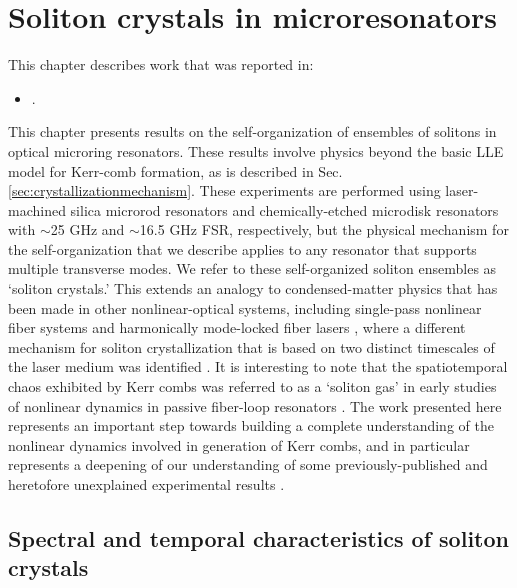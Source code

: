  \chapter{Soliton crystals in microresonators} \label{chap:SolitonCrystals}
 
  \begin{footnotesize}
 	\begin{spacing}{1.2}
 		This chapter describes work that was reported in:
 		\begin{itemize}
 			\item {}.\\
 		\end{itemize}
 	\end{spacing}
 \end{footnotesize}

This chapter presents results on the self-organization of ensembles of solitons in optical microring resonators. These results involve physics beyond the basic LLE model for Kerr-comb formation, as is described in Sec. \ref{sec:crystallizationmechanism}. These experiments are performed using laser-machined silica microrod resonators \cite{DelHaye2013} and chemically-etched microdisk \cite{Lee2012} resonators with $\sim$25 GHz and $\sim$16.5 GHz FSR, respectively, but the physical mechanism for the self-organization that we describe applies to any resonator that supports multiple transverse modes. We refer to these self-organized soliton ensembles as `soliton crystals.' This extends an analogy to condensed-matter physics that has been made in other nonlinear-optical systems, including single-pass nonlinear fiber systems \cite{Zajnulina2017} and harmonically mode-locked fiber lasers \cite{Haboucha2008,Amrani2011a}, where a different mechanism for soliton crystallization that is based on two distinct timescales of the laser medium was identified \cite{Haboucha2008c}. It is interesting to note that the spatiotemporal chaos exhibited by Kerr combs was referred to as a `soliton gas' in early studies of nonlinear dynamics in passive fiber-loop resonators \cite{Malomed1998,Mitschke1998,Schwache1997}. The work presented here represents an important step towards building a complete understanding of the nonlinear dynamics involved in generation of Kerr combs, and in particular represents a deepening of our understanding of some previously-published and heretofore unexplained experimental results \cite{DelHaye2014,DelHaye2015a}.

\section{Spectral and temporal characteristics of soliton crystals}

